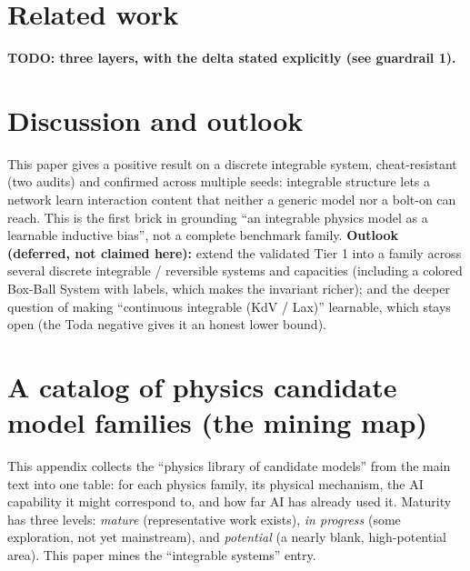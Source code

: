 \documentclass[11pt]{article}
\theoremstyle{definition}
\theoremstyle{plain}
\begin{document}
\section{Related work}\label{sec:related}
\textbf{TODO: three layers, with the delta stated explicitly (see guardrail 1).}

\section{Discussion and outlook}\label{sec:outlook}
This paper gives a positive result on a discrete integrable system, cheat-resistant (two audits) and
confirmed across multiple seeds: integrable structure lets a network learn interaction content that
neither a generic model nor a bolt-on can reach. This is the first brick in grounding ``an integrable
physics model as a learnable inductive bias'', not a complete benchmark family.
\textbf{Outlook (deferred, not claimed here):} extend the validated Tier 1 into a family across several
discrete integrable / reversible systems and capacities (including a colored Box-Ball System with
labels, which makes the invariant richer); and the deeper question of making ``continuous integrable
(KdV / Lax)'' learnable, which stays open (the Toda negative gives it an honest lower bound).

\appendix
\section{A catalog of physics candidate model families (the mining map)}\label{app:catalog}
This appendix collects the ``physics library of candidate models'' from the main text into one table:
for each physics family, its physical mechanism, the AI capability it might correspond to, and how far
AI has already used it. Maturity has three levels: \emph{mature} (representative work exists),
\emph{in progress} (some exploration, not yet mainstream), and \emph{potential} (a nearly blank,
high-potential area). This paper mines the ``integrable systems'' entry.
\end{document}
